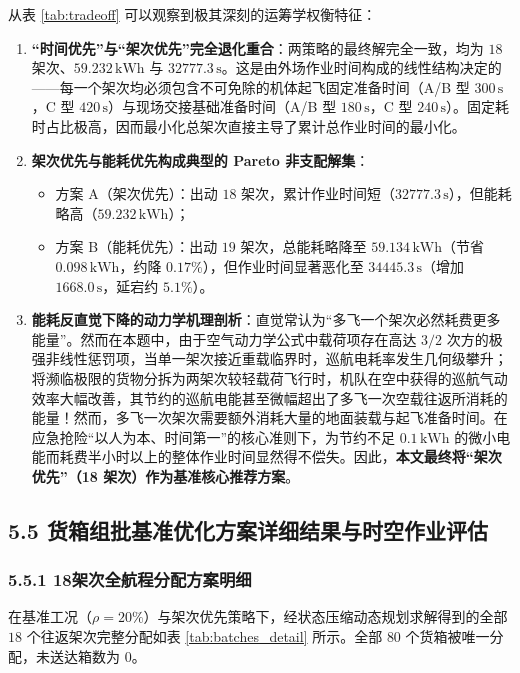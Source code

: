\documentclass[12pt,a4paper,UTF8]{ctexart}
\begin{document}
从表 \ref{tab:tradeoff} 可以观察到极其深刻的运筹学权衡特征：
\begin{enumerate}[leftmargin=*]
    \item \textbf{“时间优先”与“架次优先”完全退化重合}：两策略的最终解完全一致，均为 $18$ 架次、$59.232\,\text{kWh}$ 与 $32777.3\,\text{s}$。这是由外场作业时间构成的线性结构决定的——每一个架次均必须包含不可免除的机体起飞固定准备时间（A/B 型 $300\,\text{s}$，C 型 $420\,\text{s}$）与现场交接基础准备时间（A/B 型 $180\,\text{s}$，C 型 $240\,\text{s}$）。固定耗时占比极高，因而最小化总架次直接主导了累计总作业时间的最小化。
    \item \textbf{架次优先与能耗优先构成典型的 Pareto 非支配解集}：
    \begin{itemize}
        \item 方案 A（架次优先）：出动 $18$ 架次，累计作业时间短（$32777.3\,\text{s}$），但能耗略高（$59.232\,\text{kWh}$）；
        \item 方案 B（能耗优先）：出动 $19$ 架次，总能耗略降至 $59.134\,\text{kWh}$（节省 $0.098\,\text{kWh}$，约降 $0.17\%$），但作业时间显著恶化至 $34445.3\,\text{s}$（增加 $1668.0\,\text{s}$，延宕约 $5.1\%$）。
    \end{itemize}
    \item \textbf{能耗反直觉下降的动力学机理剖析}：直觉常认为“多飞一个架次必然耗费更多能量”。然而在本题中，由于空气动力学公式中载荷项存在高达 $3/2$ 次方的极强非线性惩罚项，当单一架次接近重载临界时，巡航电耗率发生几何级攀升；将濒临极限的货物分拆为两架次较轻载荷飞行时，机队在空中获得的巡航气动效率大幅改善，其节约的巡航电能甚至微幅超出了多飞一次空载往返所消耗的能量！然而，多飞一次架次需要额外消耗大量的地面装载与起飞准备时间。在应急抢险“以人为本、时间第一”的核心准则下，为节约不足 $0.1\,\text{kWh}$ 的微小电能而耗费半小时以上的整体作业时间显然得不偿失。因此，\textbf{本文最终将“架次优先”（18 架次）作为基准核心推荐方案}。
\end{enumerate}

\subsection{5.5 货箱组批基准优化方案详细结果与时空作业评估}

\subsubsection{5.5.1 18架次全航程分配方案明细}
在基准工况（$\rho=20\%$）与架次优先策略下，经状态压缩动态规划求解得到的全部 $18$ 个往返架次完整分配如表 \ref{tab:batches_detail} 所示。全部 $80$ 个货箱被唯一分配，未送达箱数为 0。
\end{document}
